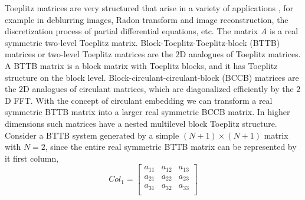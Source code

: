 \documentclass{UCF_ETD}
\begin{document}
 Toeplitz matrices are very structured that arise in a variety of applications \cite{Hansen2006}, for example in deblurring images, Radon transform and image reconstruction, the discretization process of partial differential equations, etc.
 The matrix $A$ is a real symmetric two-level Toeplitz matrix. Block-Toeplitz-Toeplitz-block (BTTB) matrices or two-level Toeplitz matrices are the $2$D analogues of Toeplitz matrices. A BTTB matrix is a block matrix with Toeplitz blocks, and it has Toeplitz structure on the block level. Block-circulant-circulant-block (BCCB) matrices are the $2$D analogues of circulant matrices, which are diagonalized efficiently by the $2$D FFT. With the concept of circulant embedding we can transform a real symmetric BTTB matrix into a larger real symmetric BCCB matrix. In higher dimensions such matrices have a nested multilevel block Toeplitz structure.
 Consider a BTTB system generated by a simple $(N+1)\times (N+1)$ matrix with $N = 2$, since the entire real symmetric BTTB matrix can be represented by it first column,
 $$
         Col_1 = \begin{bmatrix}
         a_{11} & a_{12} & a_{13} \\
         a_{21} & a_{22} & a_{23} \\
         a_{31} & a_{32} & a_{33} \\
         \end{bmatrix}
 $$
 
\end{document}

